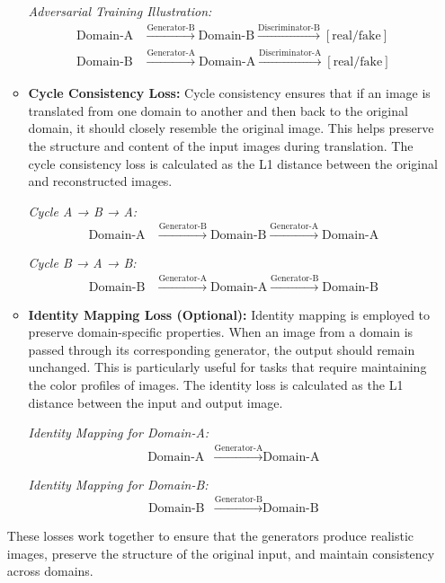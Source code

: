 \documentclass[12pt,DIV14,BCOR12mm,a4paper,footinclude=false,headinclude,parskip=half-,twoside,openright,cleardoublepage=empty,toc=index,bibliography=totoc,listof=totoc]{scrreprt}
\numberwithin{equation}{chapter}
\begin{document}
\begin{enumerate}
\begin{itemize}
				\textit{Adversarial Training Illustration:}
				\begin{align*}
				\text{Domain-A} & \xrightarrow{\text{Generator-B}} \text{Domain-B} \xrightarrow{\text{Discriminator-B}} [\text{real/fake}] \\
				\text{Domain-B} & \xrightarrow{\text{Generator-A}} \text{Domain-A} \xrightarrow{\text{Discriminator-A}} [\text{real/fake}]
				\end{align*}

				\item \textbf{Cycle Consistency Loss:} Cycle consistency ensures that if an image is translated from one domain to another and then back to the original domain, it should closely resemble the original image. This helps preserve the structure and content of the input images during translation. The cycle consistency loss is calculated as the L1 distance between the original and reconstructed images.

				\textit{Cycle A → B → A:}
				\begin{align*}
				\text{Domain-A} & \xrightarrow{\text{Generator-B}} \text{Domain-B} \xrightarrow{\text{Generator-A}} \text{Domain-A}
				\end{align*}

				\textit{Cycle B → A → B:}
				\begin{align*}
				\text{Domain-B} & \xrightarrow{\text{Generator-A}} \text{Domain-A} \xrightarrow{\text{Generator-B}} \text{Domain-B}
				\end{align*}

				\item \textbf{Identity Mapping Loss (Optional):} Identity mapping is employed to preserve domain-specific properties. When an image from a domain is passed through its corresponding generator, the output should remain unchanged. This is particularly useful for tasks that require maintaining the color profiles of images. The identity loss is calculated as the L1 distance between the input and output image.

				\textit{Identity Mapping for Domain-A:}
				\begin{align*}
				\text{Domain-A} & \xrightarrow{\text{Generator-A}} \text{Domain-A}
				\end{align*}

				\textit{Identity Mapping for Domain-B:}
				\begin{align*}
				\text{Domain-B} & \xrightarrow{\text{Generator-B}} \text{Domain-B}
				\end{align*}
		\end{itemize}

		These losses work together to ensure that the generators produce realistic images, preserve the structure of the original input, and maintain consistency across domains.
\end{enumerate}
\end{document}
